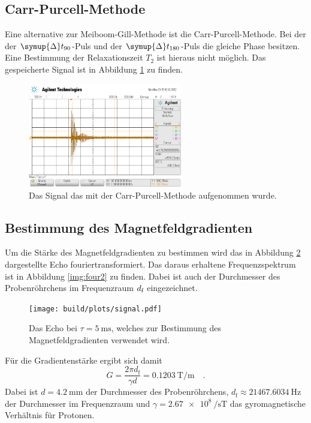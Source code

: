 \subsection{Carr-Purcell-Methode}


\noindent
Eine alternative zur Meiboom-Gill-Methode ist die Carr-Purcell-Methode. Bei der der $\symup{\Delta} t_{90}$-Puls und der $\symup{\Delta} t_{180}$-Puls die gleiche Phase besitzen.
Eine Bestimmung der Relaxationszeit $T_2$ ist hieraus nicht möglich. Das gespeicherte Signal ist in Abbildung \ref{img:Sig2} zu finden.
\begin{figure}[H]
  \centering
  \includegraphics[width=0.6\textwidth]{python/data/scope_3.png}
  \caption{Das Signal das mit der Carr-Purcell-Methode aufgenommen wurde.}
\label{img:Sig2}
\end{figure}

\subsection{Bestimmung des Magnetfeldgradienten}


\noindent
Um die Stärke des Magnetfeldgradienten zu bestimmen wird das in Abbildung \ref{img:four1} dargestellte Echo fouriertransformiert. 
Das daraus erhaltene Frequenzspektrum ist in Abbildung \ref{img:four2} zu finden.
Dabei ist auch der Durchmesser des Probenröhrchens im Frequenzraum $d_{\text{f}}$ eingezeichnet.

\begin{figure}[H]
  \centering
  \texttt{[image: build/plots/signal.pdf]}
  \caption{Das Echo bei $\tau = \SI{5}{\milli\second}$, welches zur Bestimmung des Magnetfeldgradienten verwendet wird.}
\label{img:four1}
\end{figure}

\noindent
Für die Gradientenstärke ergibt sich damit
\begin{equation*}
  G = \frac{2\pi d_\text{f}}{\gamma d} = \SI{0.1203}{\tesla\per\metre} \quad.
\end{equation*}
Dabei ist  $d = \SI{4.2}{\milli\metre}$ \cite{V49} der Durchmesser des Probenröhrchens, $d_\text{f} \approx \SI{21467.6034}{\hertz}$ der Durchmesser im Frequenzraum und
$\gamma = \SI{2.67e8}{\per\second\tesla}$ \cite{gyro} das gyromagnetische Verhältnis für Protonen.

